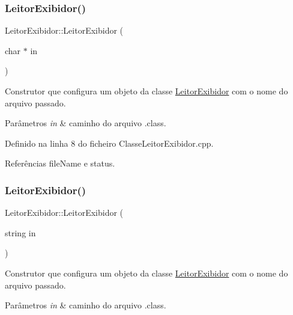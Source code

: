 \subsubsection{\texorpdfstring{Leitor\+Exibidor()}{LeitorExibidor()}\hspace{0.1cm}{\footnotesize\ttfamily [1/2]}}
{\footnotesize\ttfamily Leitor\+Exibidor\+::\+Leitor\+Exibidor (\begin{DoxyParamCaption}\item[{char $\ast$}]{in }\end{DoxyParamCaption})}



Construtor que configura um objeto da classe \hyperlink{classLeitorExibidor}{Leitor\+Exibidor} com o nome do arquivo passado. 


\begin{DoxyParams}{Parâmetros}
{\em in} & caminho do arquivo .class. \\
\hline
\end{DoxyParams}


Definido na linha 8 do ficheiro Classe\+Leitor\+Exibidor.\+cpp.



Referências file\+Name e status.

\mbox{\label{classLeitorExibidor_a10fd8d8b58be93148ff4d527c3ab5bd3}} 
\subsubsection{\texorpdfstring{Leitor\+Exibidor()}{LeitorExibidor()}\hspace{0.1cm}{\footnotesize\ttfamily [2/2]}}
{\footnotesize\ttfamily Leitor\+Exibidor\+::\+Leitor\+Exibidor (\begin{DoxyParamCaption}\item[{string}]{in }\end{DoxyParamCaption})}



Construtor que configura um objeto da classe \hyperlink{classLeitorExibidor}{Leitor\+Exibidor} com o nome do arquivo passado. 


\begin{DoxyParams}{Parâmetros}
{\em in} & caminho do arquivo .class. \\
\hline
\end{DoxyParams}


